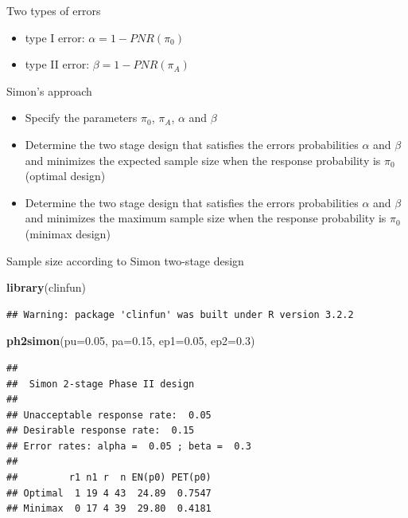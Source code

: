 \documentclass{beamer}
\newenvironment{Shaded}{}{}
\newcommand{\KeywordTok}[1]{\textcolor[rgb]{0.00,0.44,0.13}{\textbf{{#1}}}}
\newcommand{\DataTypeTok}[1]{\textcolor[rgb]{0.56,0.13,0.00}{{#1}}}
\newcommand{\FloatTok}[1]{\textcolor[rgb]{0.25,0.63,0.44}{{#1}}}
\newcommand{\NormalTok}[1]{{#1}}
\begin{document}
\begin{frame}{Two types of errors}

\begin{itemize}
\itemsep1pt\parskip0pt
\item
  type I error: \(\alpha = 1- PNR(\pi_0)\)
\item
  type II error: \(\beta = 1- PNR(\pi_A)\)
\end{itemize}

\end{frame}

\begin{frame}{Simon's approach}

\begin{itemize}
\itemsep1pt\parskip0pt
\item
  Specify the parameters \(\pi_0\), \(\pi_A\), \(\alpha\) and \(\beta\)
\item
  Determine the two stage design that satisfies the errors probabilities
  \(\alpha\) and \(\beta\) and minimizes the expected sample size when
  the response probability is \(\pi_0\) (optimal design)
\item
  Determine the two stage design that satisfies the errors probabilities
  \(\alpha\) and \(\beta\) and minimizes the maximum sample size when
  the response probability is \(\pi_0\) (minimax design)
\end{itemize}

\end{frame}

\begin{frame}[fragile]{Sample size according to Simon two-stage design}

\begin{Shaded}
\begin{Highlighting}[]
\KeywordTok{library}\NormalTok{(clinfun)}
\end{Highlighting}
\end{Shaded}

\begin{verbatim}
## Warning: package 'clinfun' was built under R version 3.2.2
\end{verbatim}

\begin{Shaded}
\begin{Highlighting}[]
\KeywordTok{ph2simon}\NormalTok{(}\DataTypeTok{pu=}\FloatTok{0.05}\NormalTok{, }\DataTypeTok{pa=}\FloatTok{0.15}\NormalTok{, }\DataTypeTok{ep1=}\FloatTok{0.05}\NormalTok{, }\DataTypeTok{ep2=}\FloatTok{0.3}\NormalTok{)}
\end{Highlighting}
\end{Shaded}

\begin{verbatim}
## 
##  Simon 2-stage Phase II design 
## 
## Unacceptable response rate:  0.05 
## Desirable response rate:  0.15 
## Error rates: alpha =  0.05 ; beta =  0.3 
## 
##         r1 n1 r  n EN(p0) PET(p0)
## Optimal  1 19 4 43  24.89  0.7547
## Minimax  0 17 4 39  29.80  0.4181
\end{verbatim}

\end{frame}
\end{document}
